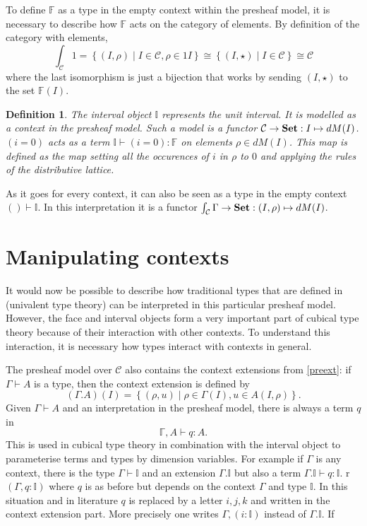 \documentclass[12pt,a4paper,twoside,xetex]{book}
\newcommand{\keyword}[1]{\emph{#1}\index{#1}}
\newtheorem{definition}[theorem]{Definition}
\begin{document}
To define $\mathbb{F}$ as a type in the empty context within the presheaf 
model, it is necessary to describe how $\mathbb{F}$ acts on the category of 
elements. By definition of the category with elements, 
$$\int_{\mathcal{C}} 1 = \left\{ (I, \rho ) \mid I \in \mathcal{C}, \rho \in 1I 
\right\} \cong \left\{ (I, \star ) \mid I \in \mathcal{C} \right\}  \cong 
\mathcal{C}$$ where the last isomorphism is just a bijection that works by 
sending $(I, \star )$ to the set $\mathbb{F}(I)$.


\begin{definition}\label{interval}
The \keyword{interval object} $\mathbb{I}$ represents the unit interval. It is 
modelled as a context in the presheaf model. Such a model is a functor 
$\mathcal{C} \rightarrow \text{\textbf{Set}} : I \mapsto dM(I)$.  $(i=0)$ acts as a term 
$\mathbb{I} \vdash (i = 0) : \mathbb{F}$ on elements $\rho \in dM (I)$. This 
map is defined as the map setting all the occurences of $i$ in $\rho$ to $0$ 
and applying the rules of the distributive lattice.
\end{definition}

As it goes for every context, it can also be seen as a type in the empty 
context $() \vdash \mathbb{I}$. 
In this interpretation it is a functor  $\int_{\mathcal{C}} \Gamma \rightarrow 
\text{\textbf{Set}} : (I,\rho) \mapsto dM(I)$.



\section{Manipulating contexts}

It would now be possible to describe how traditional types that are defined in 
(univalent type theory) can be interpreted in this particular presheaf model. 
However, the face and interval objects form a very important part of cubical 
type theory because of their interaction with other contexts. To understand 
this interaction, it is necessary how types interact with contexts in general.  

The presheaf model over $\mathcal{C}$ also contains the context extensions from 
\cref{preext}: if $\Gamma \vdash A$ is a type, then the context extension is 
defined by $$(\Gamma . A)(I) = \left\{ (\rho , u ) \mid \rho \in \Gamma (I), u 
\in A (I,\rho) \right\}.$$
Given $\Gamma \vdash A$ and an interpretation in the presheaf model, there is 
always a term $q$ in $$\mathbb{\Gamma}, A \vdash q : A.$$ This is used in 
cubical type theory in combination with the interval object to parameterise 
terms and types by dimension variables. For example if $\Gamma$ is any context, 
there is the type $\Gamma \vdash \mathbb{I}$ and an extension $\Gamma. 
\mathbb{I}$ but also a term $\Gamma. \mathbb{I} \vdash q : \mathbb{I}$.
r $(\Gamma, q : \mathbb{I})$ where $q$ is as before but depends on the context 
$\Gamma$ and type $\mathbb{I}$. In this situation and in literature $q$ is 
replaced by a letter $i,j,k$ and written in the context extension part. More 
precisely one writes $\Gamma, (i: \mathbb{I})$ instead of $\Gamma . 
\mathbb{I}$. If 
\end{document}
